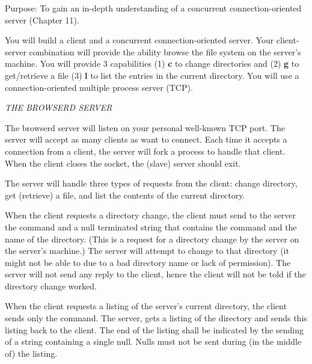 

\parindent 0pt

Purpose: To gain an in-depth understanding of
a concurrent connection-oriented server (Chapter 11).

You will build a client and a concurrent connection-oriented server.
Your client-server combination will provide the ability browse
the file system on the server's machine.
You will provide 3 capabilities 
(1) {\bf c} to change directories and
(2) {\bf g} to get/retrieve a file
(3) {\bf l} to list the entries in the current directory.
You will use a connection-oriented multiple process server (TCP).

{\it THE BROWSERD SERVER}

The {\ltt{}browserd} server will listen on your personal well-known TCP port.
The server will accept as many clients as want to connect.
Each time it accepts a connection from a client,
the server will fork a process to handle that client. 
When the client closes the socket, the (slave) server should exit.

The server will handle three types of requests from the client:
change directory,
get (retrieve) a file,
and list the contents of the current directory.

When the client requests a directory change,
the client must send to the server the command and a null terminated
string that contains the command and the name of the directory. 
(This is a request for a directory change by the server on the server's 
machine.)
The server will attempt to change to that directory (it might not be able
to due to a bad directory name or lack of permission).
The server will not send any reply to the client,
hence the client will not be told if the directory change worked.

When the client requests a listing of the server's current directory,
the client sends only the command.
The server, gets a listing of the directory and sends this listing
back to the client.
The end of the listing shall be indicated by the sending of a string
containing a single null.
Nulls must not be sent during (in the middle of) the listing. 

